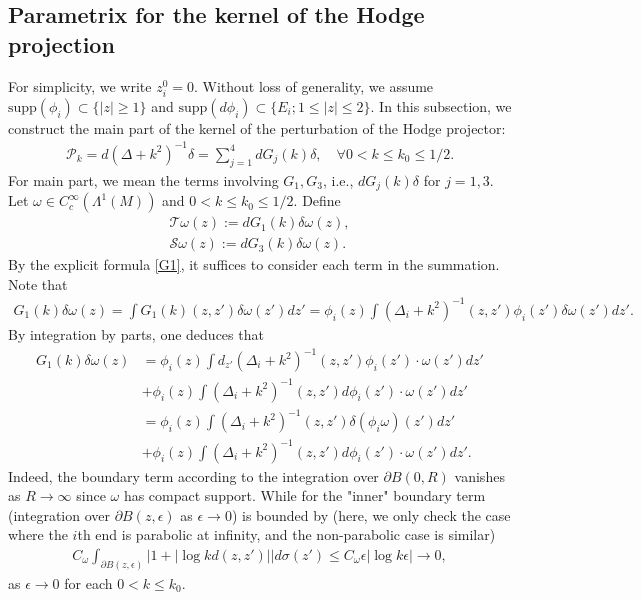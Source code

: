 \documentclass[12pt]{amsart}
\begin{document}
\subsection{Parametrix for the kernel of the Hodge projection}\label{sec2.2}

For simplicity, we write $z_{i}^0 = 0$. Without loss of generality, we assume $\textrm{supp}(\phi_i) \subset \{|z|\ge 1\}$ and $\textrm{supp}(d\phi_i) \subset \{E_i; 1\le |z|\le 2\}$. In this subsection, we construct the main part of the kernel of the perturbation of the Hodge projector:
\begin{align*}
    \mathcal{P}_k = d (\Delta + k^2)^{-1} \delta = \sum_{j=1}^4 d G_j(k) \delta,\quad \forall 0<k\le k_0\le 1/2.
\end{align*}
For main part, we mean the terms involving $G_1, G_3$, i.e., $dG_j(k)\delta$ for $j=1,3$. Let $\omega \in C_c^\infty(\Lambda^1(M))$ and $0<k\le k_0\le 1/2$. Define
\begin{align*}
    \mathcal{T}\omega(z) := dG_1(k)\delta \omega(z),\\
    \mathcal{S}\omega(z):= d G_3(k) \delta \omega(z).
\end{align*}
By the explicit formula \eqref{G1}, it suffices to consider each term in the summation. Note that 
\begin{align*}
    G_1(k) \delta\omega(z) =  \int G_1(k)(z,z') \delta \omega(z') dz'= \phi_i(z) \int (\Delta_i +k^2)^{-1}(z,z') \phi_i(z') \delta \omega(z') dz'.
\end{align*}
By integration by parts, one deduces that
\begin{align*}
    G_1(k) \delta\omega(z) &= \phi_i(z) \int d_{z'}(\Delta_i +k^2)^{-1}(z,z') \phi_i(z') \cdot \omega(z') dz'\\
    &+ \phi_i(z) \int (\Delta_i +k^2)^{-1}(z,z') d\phi_i(z') \cdot \omega(z') dz'\\
    &= \phi_i(z) \int (\Delta_i +k^2)^{-1}(z,z') \delta(\phi_i \omega)(z') dz'\\
    &+ \phi_i(z) \int (\Delta_i +k^2)^{-1}(z,z') d\phi_i(z') \cdot \omega(z') dz'.
\end{align*}
Indeed, the boundary term according to the integration over $\partial B(0,R)$ vanishes as $R\to \infty$ since $\omega$ has compact support. While for the "inner" boundary term (integration over $\partial B(z,\epsilon)$ as $\epsilon \to 0$) is bounded by (here, we only check the case where the $i$th end is parabolic at infinity, and the non-parabolic case is similar)
\begin{align*}
    C_\omega \int_{\partial B(z,\epsilon)} \left|1 + |\log{kd(z,z')}| \right| d\sigma(z') \le C_\omega \epsilon |\log{k\epsilon}| \to 0,
\end{align*}
as $\epsilon \to 0$ for each $0<k\le k_0$.
\end{document}
